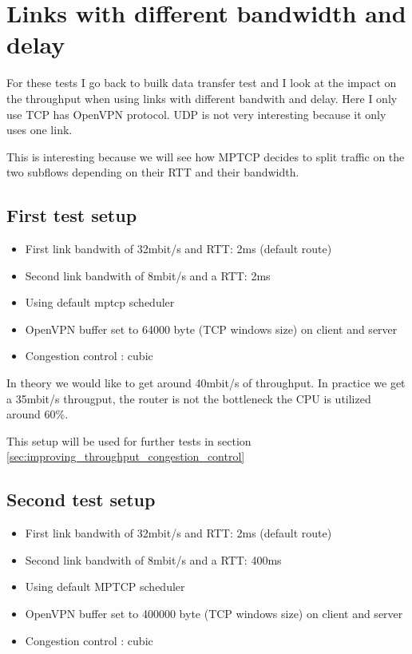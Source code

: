 \section{Links with different bandwidth and delay}

For these tests I go back to builk data transfer test and I look at the impact on the throughput when using links with different bandwith and delay.
Here I only use TCP has OpenVPN protocol. UDP is not very interesting because it only uses one link.

This is interesting because we will see how MPTCP decides to split traffic on the two subflows depending on their RTT and their bandwidth.

\subsection{First test setup} \label{sec:first_test}

\begin{itemize}
\item First link bandwith of 32mbit/s and RTT: 2ms (default route)
\item Second link bandwith of 8mbit/s and a RTT: 2ms
\item Using default mptcp scheduler
\item OpenVPN buffer set to 64000 byte (TCP windows size) on client and server
\item Congestion control : cubic
\end{itemize}

In theory we would like to get around 40mbit/s of throughput. In practice we get a 35mbit/s througput, the router is not the bottleneck the CPU is utilized around 60\%.

This setup will be used for further tests in section \ref{sec:improving_throughput_congestion_control}

\subsection{Second test setup}

\begin{itemize}
\item First link bandwith of 32mbit/s and RTT: 2ms (default route)
\item Second link bandwith of 8mbit/s and a RTT: 400ms
\item Using default MPTCP scheduler
\item OpenVPN buffer set to 400000 byte (TCP windows size) on client and server
\item Congestion control : cubic
\end{itemize}

